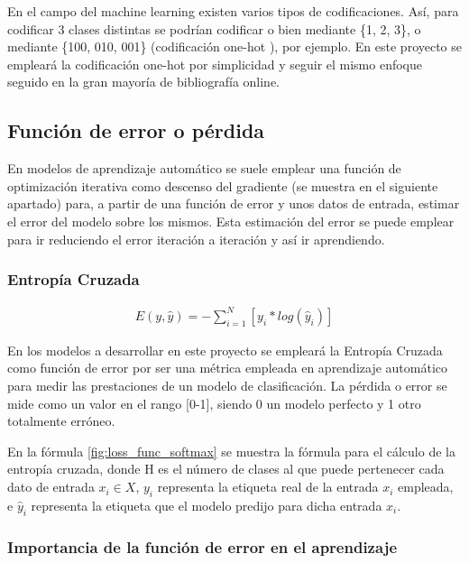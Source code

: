 En el campo del machine learning existen varios tipos de codificaciones. Así, para codificar 3 clases distintas se podrían codificar o bien mediante \{1, 2, 3\}, o mediante \{100, 010, 001\} (codificación one-hot \cite{one_hot}), por ejemplo. En este proyecto se empleará la codificación one-hot por simplicidad y seguir el mismo enfoque seguido en la gran mayoría de bibliografía online.

\subsection{Función de error o pérdida}

En modelos de aprendizaje automático se suele emplear una función de optimización iterativa como descenso del gradiente (se muestra en el siguiente apartado) para, a partir de una función de error y unos datos de entrada, estimar el error del modelo sobre los mismos. Esta estimación del error se puede emplear para ir reduciendo el error iteración a iteración y así ir aprendiendo. 

\subsubsection{Entropía Cruzada}

\begin{gather}
	E(y, \hat{y}) = - \sum_{i=1}^{N}  [y_i * log( \hat{y}_i)]
	\label{fig:loss_func_softmax}
\end{gather}

En los modelos a desarrollar en este proyecto se empleará la Entropía Cruzada como función de error por ser una métrica empleada en aprendizaje automático para medir las prestaciones de un modelo de clasificación. La pérdida o error se mide como un valor en el rango [0-1], siendo 0 un modelo perfecto y 1 otro totalmente erróneo. \cite{Cross_entropy}

En la fórmula \ref{fig:loss_func_softmax} se muestra la fórmula para el cálculo de la entropía cruzada, donde H es el número de clases al que puede pertenecer cada dato de entrada $x_i \in X$, $y_i$ representa la etiqueta real de la entrada $x_i$ empleada, e $\hat{y}_i$ representa la etiqueta que el modelo predijo para dicha entrada $x_i$.  \\

\subsubsection{Importancia de la función de error en el aprendizaje}

